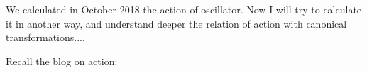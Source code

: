 

\baselineskip=14pt
\def\vare {\varepsilon}
\def\A {{\bf A}}
\def\t {\tilde}
\def\a {\alpha}
\def\K {{\bf K}}
\def\N {{\bf N}}
\def\V {{\cal V}}
\def\s {{\sigma}}
\def\S {{\Sigma}}
\def\s {{\sigma}}
\def\p{\partial}
\def\vare{{\varepsilon}}
\def\Q {{\bf Q}}
\def\D {{\cal D}}
\def\G {{\Gamma}}
\def\C {{\bf C}}
\def\M {{\cal M}}
\def\Z {{\bf Z}}
\def\U  {{\cal U}}
\def\H {{\cal H}}
\def\R  {{\bf R}}
\def\S  {{\bf S}}
\def\E  {{\bf E}}
\def\l {\lambda}
\def\ll {{\bf l}}
\def\degree {{\bf {\rm degree}\,\,}}
\def \finish {${\,\,\vrule height1mm depth2mm width 8pt}$}
\def \m {\medskip}
\def\p {\partial}
\def\r {{\bf r}}
\def\pt {{\bf p}}
\def\v {{\bf v}}
\def\n {{\bf n}}
\def\t {{\bf t}}
\def\b {{\bf b}}
\def\c {{\bf c }}
\def\e{{\bf e}}
\def\ac {{\bf a}}
\def \X   {{\bf X}}
\def \Y   {{\bf Y}}
\def \x   {{\bf x}}
\def \y   {{\bf y}}
\def \G{{\cal G}}
\def\w {{\omega}}
\def \Tr  {{\rm Tr\,}}
\def\V {{\cal V}}



   We calculated in October 2018 the action of
oscillator. Now I will try to calculate it in another way,
and understand deeper the relation of action with
canonical transformations....


Recall the blog on action:

